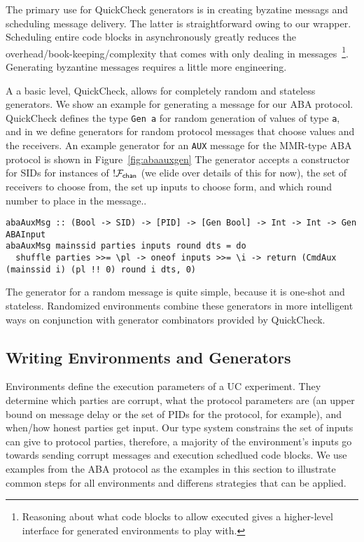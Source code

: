 The primary use for QuickCheck generators is in creating byzatine messags and scheduling message delivery.
The latter is straightforward owing to our wrapper. Scheduling entire code blocks in asynchronously greatly reduces the overhead/book-keeping/complexity that comes with only dealing in messages~\footnote{Reasoning about what code blocks to allow executed gives a higher-level interface for generated environments to play with.}.
Generating byzantine messages requires a little more engineering. 

A a basic level, QuickCheck, allows for completely random and stateless generators. We show an example for generating a message for our ABA protocol.
QuickCheck defines the type \texttt{Gen a} for random generation of values of type \texttt{a}, and in \us we define generators for random protocol messages that choose values and the receivers. 
An example generator for an \texttt{AUX} message for the MMR-type ABA protocol is shown in Figure~\ref{fig:abaauxgen}
The generator accepts a constructor for SIDs for instances of $!\mathcal{F}_{{\mathsf {chan}}}$ (we elide over details of this for now), the set of receivers to choose from, the set up inputs to choose form, and which round number to place in the message.. 
\begin{figure*}
\begin{lstlisting}
abaAuxMsg :: (Bool -> SID) -> [PID] -> [Gen Bool] -> Int -> Int -> Gen ABAInput
abaAuxMsg mainssid parties inputs round dts = do
  shuffle parties >>= \pl -> oneof inputs >>= \i -> return (CmdAux (mainssid i) (pl !! 0) round i dts, 0)
\end{lstlisting}
\caption{Generator for specfically AUX messages. AUX is a constructor of the type \texttt{ABAInput}.}
\label{fig:abaauxgen}
\end{figure*}
The generator for a random message is quite simple, because it is one-shot and stateless. 
Randomized environments combine these generators in more intelligent ways on conjunction with generator combinators provided by QuickCheck.

\subsection{Writing Environments and Generators}
Environments define the execution parameters of a UC experiment.
They determine which parties are corrupt, what the protocol parameters are (an upper bound on message delay or the set of PIDs for the protocol, for example), and when/how honest parties get input.
Our type system constrains the set of inputs \Z can give to protocol parties, therefore, a majority of the environment's inputs go towards sending corrupt messages and execution schedlued code blocks.
We use examples from the ABA protocol as the examples in this section to illustrate common steps for all environments and differens strategies that can be applied.

